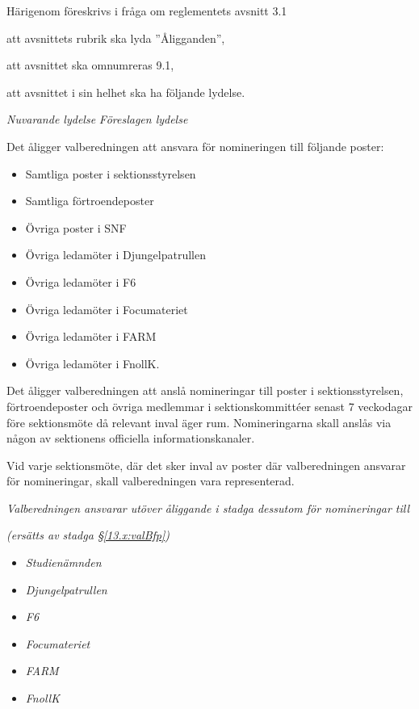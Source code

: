 \documentclass{article}
\newenvironment{lydelse}
    {\begin{paracol}{2}%
        \emph{Nuvarande lydelse}%
        \switchcolumn%
        \emph{Föreslagen lydelse}%
    \end{paracol}%
    \begin{enumerate}[label=\thesubsection.\arabic*]%
    \begin{paracol}{2}%
    }{\end{paracol}\end{enumerate}}
\begin{document}
Härigenom föreskrivs i fråga om reglementets avsnitt 3.1

\begin{dels}
    \item att avsnittets rubrik ska lyda ''Åligganden'',
    \item att avsnittet ska omnumreras 9.1,
    \item att avsnittet i sin helhet ska ha följande lydelse.
\end{dels}

\begin{lydelse}
    \setcounter{section}{3}
    \setcounter{subsection}{1}

    \item Det åligger valberedningen att ansvara för nomineringen till följande poster:
	\begin{itemize}
		\item Samtliga poster i sektionsstyrelsen
		\item Samtliga förtroendeposter
		\item Övriga poster i SNF
		\item Övriga ledamöter i Djungelpatrullen
		\item Övriga ledamöter i F6
		\item Övriga ledamöter i Focumateriet
		\item Övriga ledamöter i FARM
		\item Övriga ledamöter i FnollK.
	\end{itemize}
	
	\item Det åligger valberedningen att anslå nomineringar till poster i sektionsstyrelsen, förtroendeposter och övriga medlemmar i sektionskommittéer senast 7 veckodagar före sektionsmöte då relevant inval äger rum. Nomineringarna skall anslås via någon av sektionens officiella informationskanaler.

    \item Vid varje sektionsmöte, där det sker inval av poster där valberedningen ansvarar för nomineringar, skall valberedningen vara representerad.
    
    \setcounter{section}{9}
    \setcounter{subsection}{0}
    
    \switchcolumn
    \item \emph{Valberedningen ansvarar utöver åliggande i stadga dessutom för nomineringar till}
    \item[] \emph{(ersätts av stadga \S \ref{13.x:valBfp})}
    \vspace{4ex}
    \begin{itemize}
        \item \emph{Studienämnden} %
        \item \emph{Djungelpatrullen}
        \item \emph{F6}
        \item \emph{Focumateriet}
        \item \emph{FARM}
        \item \emph{FnollK}
    \end{itemize}
    

\end{lydelse}
\end{document}
